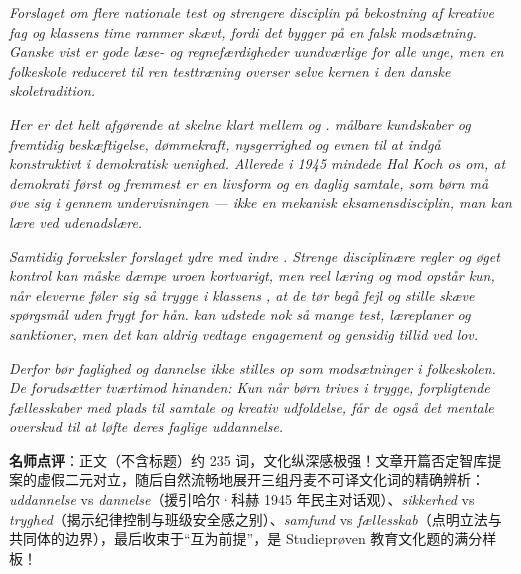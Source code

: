 \begin{answerbox}
\textit{Forslaget om flere nationale test og strengere disciplin på bekostning af kreative fag og klassens time rammer skævt, fordi det bygger på en falsk modsætning. Ganske vist er gode læse- og regnefærdigheder uundværlige for alle unge, men en folkeskole reduceret til ren testtræning overser selve kernen i den danske skoletradition.}

\textit{Her er det helt afgørende at skelne klart mellem  og .  målbare kundskaber og fremtidig beskæftigelse,  dømmekraft, nysgerrighed og evnen til at indgå konstruktivt i demokratisk uenighed. Allerede i 1945 mindede Hal Koch os om, at demokrati først og fremmest er en livsform og en daglig samtale, som børn må øve sig i gennem undervisningen --- ikke en mekanisk eksamensdisciplin, man kan lære ved udenadslære.}

\textit{Samtidig forveksler forslaget ydre  med indre . Strenge disciplinære regler og øget kontrol kan måske dæmpe uroen kortvarigt, men reel læring og mod opstår kun, når eleverne føler sig så trygge i klassens , at de tør begå fejl og stille skæve spørgsmål uden frygt for hån.  kan udstede nok så mange test, læreplaner og sanktioner, men det kan aldrig vedtage engagement og gensidig tillid ved lov.}

\textit{Derfor bør faglighed og dannelse ikke stilles op som modsætninger i folkeskolen. De forudsætter tværtimod hinanden: Kun når børn trives i trygge, forpligtende fællesskaber med plads til samtale og kreativ udfoldelse, får de også det mentale overskud til at løfte deres faglige uddannelse.}

\small\textbf{名师点评}：正文（不含标题）约 235 词，文化纵深感极强！文章开篇否定智库提案的虚假二元对立，随后自然流畅地展开三组丹麦不可译文化词的精确辨析：\textit{uddannelse} vs \textit{dannelse}（援引哈尔·科赫 1945 年民主对话观）、\textit{sikkerhed} vs \textit{tryghed}（揭示纪律控制与班级安全感之别）、\textit{samfund} vs \textit{fællesskab}（点明立法与共同体的边界），最后收束于“互为前提”，是 Studieprøven 教育文化题的满分样板！
\end{answerbox}